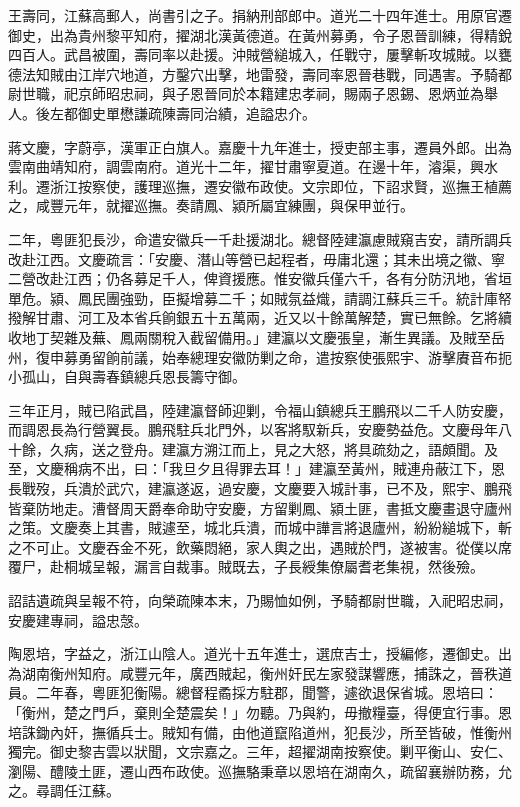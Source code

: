 \begin{pinyinscope}
王壽同，江蘇高郵人，尚書引之子。捐納刑部郎中。道光二十四年進士。用原官遷御史，出為貴州黎平知府，擢湖北漢黃德道。在黃州募勇，令子恩晉訓練，得精銳四百人。武昌被圍，壽同率以赴援。沖賊營縋城入，任戰守，屢擊斬攻城賊。以甕德法知賊由江岸穴地道，方鑿穴出擊，地雷發，壽同率恩晉巷戰，同遇害。予騎都尉世職，祀京師昭忠祠，與子恩晉同於本籍建忠孝祠，賜兩子恩錫、恩炳並為舉人。後左都御史單懋謙疏陳壽同治績，追謚忠介。

蔣文慶，字蔚亭，漢軍正白旗人。嘉慶十九年進士，授吏部主事，遷員外郎。出為雲南曲靖知府，調雲南府。道光十二年，擢甘肅寧夏道。在邊十年，濬渠，興水利。遷浙江按察使，護理巡撫，遷安徽布政使。文宗即位，下詔求賢，巡撫王植薦之，咸豐元年，就擢巡撫。奏請鳳、潁所屬宜練團，與保甲並行。

二年，粵匪犯長沙，命遣安徽兵一千赴援湖北。總督陸建瀛慮賊窺吉安，請所調兵改赴江西。文慶疏言：「安慶、潛山等營已起程者，毋庸北還；其未出境之徽、寧二營改赴江西；仍各募足千人，俾資援應。惟安徽兵僅六千，各有分防汛地，省垣單危。潁、鳳民團強勁，臣擬增募二千；如賊氛益熾，請調江蘇兵三千。統計庫帑撥解甘肅、河工及本省兵餉銀五十五萬兩，近又以十餘萬解楚，實已無餘。乞將續收地丁契雜及蕪、鳳兩關稅入截留備用。」建瀛以文慶張皇，漸生異議。及賊至岳州，復申募勇留餉前議，始奉總理安徽防剿之命，遣按察使張熙宇、游擊賡音布扼小孤山，自與壽春鎮總兵恩長籌守御。

三年正月，賊已陷武昌，陸建瀛督師迎剿，令福山鎮總兵王鵬飛以二千人防安慶，而調恩長為行營翼長。鵬飛駐兵北門外，以客將馭新兵，安慶勢益危。文慶母年八十餘，久病，送之登舟。建瀛方溯江而上，見之大怒，將具疏劾之，語頗聞。及至，文慶稱病不出，曰：「我旦夕且得罪去耳！」建瀛至黃州，賊連舟蔽江下，恩長戰歿，兵潰於武穴，建瀛遂返，過安慶，文慶要入城計事，已不及，熙宇、鵬飛皆棄防地走。漕督周天爵奉命助守安慶，方留剿鳳、潁土匪，書抵文慶畫退守廬州之策。文慶奏上其書，賊遽至，城北兵潰，而城中譁言將退廬州，紛紛縋城下，斬之不可止。文慶吞金不死，飲藥悶絕，家人輿之出，遇賊於門，遂被害。從僕以席覆尸，赴桐城呈報，漏言自裁事。賊既去，子長綬集僚屬耆老集視，然後殮。

詔詰遺疏與呈報不符，向榮疏陳本末，乃賜恤如例，予騎都尉世職，入祀昭忠祠，安慶建專祠，謚忠愨。

陶恩培，字益之，浙江山陰人。道光十五年進士，選庶吉士，授編修，遷御史。出為湖南衡州知府。咸豐元年，廣西賊起，衡州奸民左家發謀響應，捕誅之，晉秩道員。二年春，粵匪犯衡陽。總督程矞採方駐郡，聞警，遽欲退保省城。恩培曰：「衡州，楚之門戶，棄則全楚震矣！」勿聽。乃與約，毋撤糧臺，得便宜行事。恩培誅鋤內奸，撫循兵士。賊知有備，由他道竄陷道州，犯長沙，所至皆破，惟衡州獨完。御史黎吉雲以狀聞，文宗嘉之。三年，超擢湖南按察使。剿平衡山、安仁、瀏陽、醴陵土匪，遷山西布政使。巡撫駱秉章以恩培在湖南久，疏留襄辦防務，允之。尋調任江蘇。


\end{pinyinscope}

